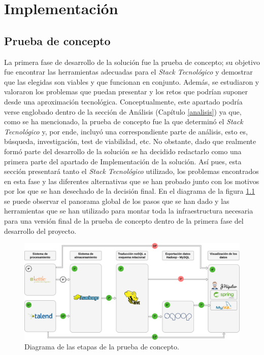 \chapter{Implementación} \label{implementacion}
\section{Prueba de concepto} \label{implementacion.prueba}

La primera fase de desarrollo de la solución fue la prueba de concepto; su objetivo fue encontrar las herramientas adecuadas para el \textit{Stack Tecnológico} y demostrar que las elegidas son viables y que funcionan en conjunto. Además, se estudiaron y valoraron los problemas que puedan presentar y los retos que podrían suponer desde una aproximación tecnológica. Conceptualmente, este apartado podría verse englobado dentro de la sección de Análisis (Capítulo \ref{analisis}) ya que, como se ha mencionado, la prueba de concepto fue la que determinó el \textit{Stack Tecnológico} y, por ende, incluyó una correspondiente parte de análisis, esto es, búsqueda, investigación, test de viabilidad, etc. No obstante, dado que realmente formó parte del desarrollo de la solución se ha decidido redactarlo como una primera parte del apartado de Implementación de la solución. Así pues, esta sección presentará tanto el \textit{Stack Tecnológico} utilizado, los problemas encontrados en esta fase y las diferentes alternativas que se han probado junto con los motivos por los que se han desechado de la decisión final. En el diagrama de la figura \ref{fig:pruebaconceptoglobal} se puede observar el panorama global de los pasos que se han dado y las herramientas que se han utilizado para montar toda la infraestructura necesaria para una versión final de la prueba de concepto dentro de la primera fase del desarrollo del proyecto. 

\begin{landscape}

\begin{figure}[p!]
    
    \includegraphics[width=\linewidth]{Imagenes/pruebadeconceptoglobal}
    \caption{Diagrama de las etapas de la prueba de concepto.}
    \label{fig:pruebaconceptoglobal}
\end{figure}

\end{landscape}


